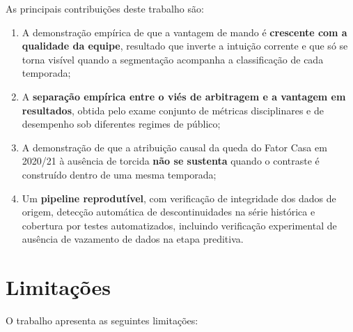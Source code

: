 As principais contribuições deste trabalho são:

\begin{enumerate}
  \item A demonstração empírica de que a vantagem de mando é \textbf{crescente
    com a qualidade da equipe}, resultado que inverte a intuição corrente e que
    só se torna visível quando a segmentação acompanha a classificação de cada
    temporada;
  \item A \textbf{separação empírica entre o viés de arbitragem e a vantagem em
    resultados}, obtida pelo exame conjunto de métricas disciplinares e de
    desempenho sob diferentes regimes de público;
  \item A demonstração de que a atribuição causal da queda do Fator Casa em
    2020/21 à ausência de torcida \textbf{não se sustenta} quando o contraste é
    construído dentro de uma mesma temporada;
  \item Um \textbf{pipeline reprodutível}, com verificação de integridade dos
    dados de origem, detecção automática de descontinuidades na série histórica
    e cobertura por testes automatizados, incluindo verificação experimental de
    ausência de vazamento de dados na etapa preditiva.
\end{enumerate}

\section{Limitações}\label{sec:limitacoes}

O trabalho apresenta as seguintes limitações:

